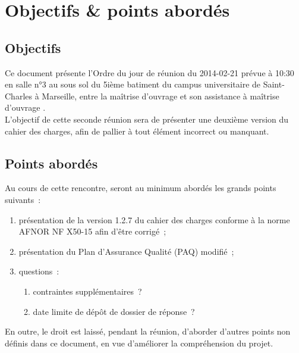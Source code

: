 \documentclass[11pt,fleqn]{report}
\begin{document}
\ZMakeCover


\chapter{Objectifs \& points abordés}

\section{Objectifs}
Ce document présente l'Ordre du jour de réunion du 2014-02-21 prévue à 10:30 en salle n°3 au sous sol du 5ième batiment du campus universitaire de Saint-Charles à Marseille, entre la maîtrise d'ouvrage \mo et son assistance à maîtrise d'ouvrage \amo.
\\
L'objectif de cette seconde réunion sera de présenter une deuxième version du cahier des charges, afin de pallier à tout élément incorrect ou manquant.

\section{Points abordés}
Au cours de cette rencontre, seront au minimum abordés les grands points suivants~:
\begin{enumerate}
	\item présentation de la version 1.2.7 du cahier des charges conforme à la norme AFNOR NF X50-15 afin d'être corrigé~;
	\item présentation du Plan d'Assurance Qualité (PAQ) modifié~;
	\item questions~:
	\begin{enumerate}
		\item contraintes supplémentaires~?
		\item date limite de dépôt de dossier de réponse~?
	\end{enumerate}
\end{enumerate}
En outre, le droit est laissé, pendant la réunion, d'aborder d'autres points non définis dans ce document, en vue d'améliorer la compréhension du projet.
\end{document}
